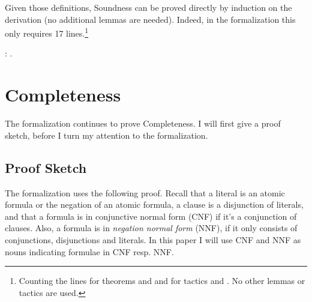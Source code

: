 \documentclass{article}
\newenvironment{code}%
 {\small\begin{list}{}%
         {\setlength{\leftmargin}{10mm}}%
         \item[]%
 }
 {\end{list}}
\begin{document}
Given those definitions, Soundness can be proved directly by induction on the derivation (no additional lemmas are needed). Indeed, in the formalization this only requires 17 lines.\footnote{Counting the lines for theorems  and  and for tactics  and . No other lemmas or tactics are used.}
\begin{code}
\coqdocnoindent
{}  : .\coqdoceol
\end{code}
\section{Completeness}\label{sec_complete}

The formalization continues to prove Completeness. I will first give a proof sketch, before I turn my attention to the formalization.

\subsection{Proof Sketch}\label{sec_complete_sketch}

The formalization uses the following proof. Recall that a literal is an atomic formula or the negation of an atomic formula, a clause is a disjunction of literals, and that a formula is in conjunctive normal form (CNF) if it's a conjunction of clauses. Also, a formula is in \emph{negation normal form} (NNF), if it only consists of conjunctions, disjunctions and literals. In this paper I will use CNF and NNF as nouns indicating formulae in CNF resp. NNF.\\
\end{document}

